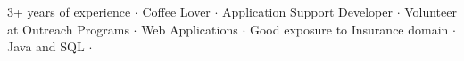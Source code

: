 

\begin{cvparagraph}
3+ years of experience ${\cdotp}$ Coffee Lover ${\cdotp}$ Application Support Developer ${\cdotp}$ Volunteer at Outreach Programs ${\cdotp}$ Web Applications ${\cdotp}$ Good exposure to Insurance domain ${\cdotp}$ Java and SQL ${\cdotp}$
\end{cvparagraph}
